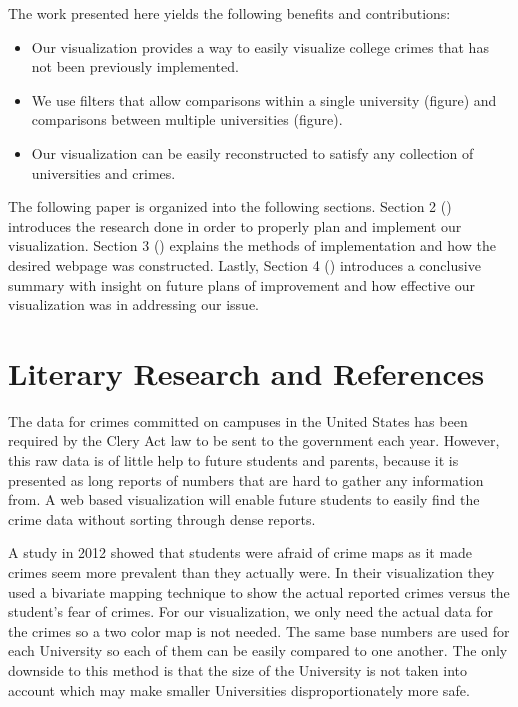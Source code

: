 \documentclass[journal]{vgtc}                %
\begin{document}
The work presented here yields the following benefits and contributions:
\begin{itemize}
\setlength\itemsep{0em}
\item Our visualization provides a way to easily visualize college crimes that has not been previously implemented.
\item We use filters that allow comparisons within a single university (figure) and comparisons between multiple universities (figure).
\item Our visualization can be easily reconstructed to satisfy any collection of universities and crimes.
\end{itemize}
\indent The following paper is organized into the following sections.  Section 2 () introduces the research done in order to properly plan and implement our visualization. Section 3 () explains the methods of implementation and how the desired webpage was constructed. Lastly, Section 4 () introduces a conclusive summary with insight on future plans of improvement and how effective our visualization was in addressing our issue.\\

\section{Literary Research and References} \label{research}
The data for crimes committed on campuses in the United States has been required by the Clery Act law to be sent to the government each year.  However, this raw data is of little help to future students and parents, because it is presented as long reports of numbers that are hard to gather any information from\cite{lipka-2011}.  A web based visualization will enable future students to easily find the crime data without sorting through dense reports.

A study in 2012 showed that students were afraid of crime maps as it made crimes seem more prevalent than they actually were\cite{fuhrmann-huynh-scholz-2013}. In their visualization they used a bivariate mapping technique to show the actual reported crimes versus the student’s fear of crimes.  For our visualization, we only need the actual data for the crimes so a two color map is not needed.  The same base numbers are used for each University so each of them can be easily compared to one another.  The only downside to this method is that the size of the University is not taken into account which may make smaller Universities disproportionately more safe.
\end{document}
